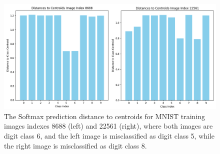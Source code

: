 


\begin{figure}[H]
    \centering
    \includegraphics[width=0.99\columnwidth]{Figures/distances_to_centroids_8688_22561.png}
    \caption{The Softmax prediction distance to centroids for MNIST training images indexes 8688 (left) and 22561 (right), where both images are digit class 6, and the left image is misclassified as digit class 5, while the right image is misclassified as digit class 8.}
    \label{fig:distances_to_centroids_8688_22561} 
\end{figure}






